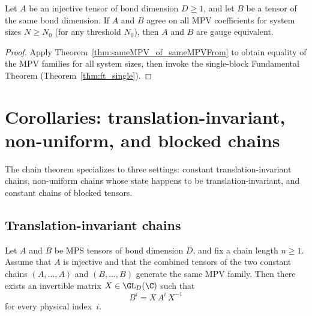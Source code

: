 \begin{theorem}%
    \label{thm:ft_singleBlock_finiteLength}
    \leanok
    Let $A$ be an injective tensor of bond dimension $D \ge 1$, and let
    $B$ be a tensor of the same bond dimension. If $A$ and $B$ agree on
    all MPV coefficients for system sizes $N \ge N_0$ (for any threshold
    $N_0$), then $A$ and $B$ are gauge equivalent.
\end{theorem}

\begin{proof}
    \leanok
    Apply Theorem~\ref{thm:sameMPV_of_sameMPVFrom} to obtain
    equality of the MPV families for all system sizes, then invoke the
    single-block Fundamental Theorem (Theorem~\ref{thm:ft_single}).
\end{proof}

\section{Corollaries: translation-invariant, non-uniform, and blocked chains}%
\label{sec:ft_corollaries}

The chain theorem specializes to three settings: constant
translation-invariant chains, non-uniform chains whose state happens to be
translation-invariant, and constant chains of blocked tensors.

\subsection{Translation-invariant chains}

\begin{theorem}
    \label{thm:ti_tensors_single_gauge}
    \leanok
    Let $A$ and $B$ be MPS tensors of bond dimension $D$, and fix a chain
    length $n \ge 1$.
    Assume that $A$ is injective and that the combined tensors of the two
    constant chains $(A, \ldots, A)$ and $(B, \ldots, B)$ generate the same
    MPV family.
    Then there exists an invertible matrix $X \in \GL_D(\C)$ such that
    \[
        B^i = X\, A^i\, X^{-1}
    \]
    for every physical index~$i$.
\end{theorem}

